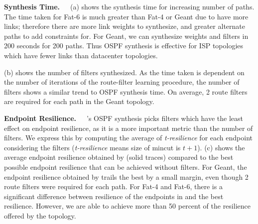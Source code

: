 \noindent\textbf{Synthesis Time.}~~~(a) 
shows the synthesis time for increasing number of paths. 
The time taken for Fat-6 is much greater than Fat-4 or Geant
due to have more links; therefore there are more link weights
to synthesize, and greater alternate paths to add constraints for. 
For Geant, we can synthesize weights and filters in 200 seconds 
for 200 paths. Thus OSPF synthesis is effective for ISP topologies
which have fewer links than datacenter topologies.

(b) shows the number of filters synthesized. 
As the time taken is dependent on the number of iterations of
the route-filter learning procedure, the number of filters
shows a similar trend to OSPF synthesis time. On average, 2 route filters
are required for each path in the Geant topology. 
\begin{figure}
	\centering
\end{figure}
\noindent\textbf{Endpoint Resilience.}~~~\name's OSPF synthesis picks
filters which have the least effect on endpoint resilience, as it  
is a more important metric than the number of filters. We express this
by computing the average of \emph{t-resilience} for each endpoint considering
the filters (\emph{t-resilience} means size of mincut is $t+1$).
(c) shows the average
endpoint resilience obtained by \name (solid traces) 
compared to the best possible endpoint resilience that  can be achieved
without filters. For Geant, the endpoint 
resilience obtained by \name trails the best by a small margin,
even though 2 route filters were required for each path. For
Fat-4 and Fat-6, there is a significant difference between resilience
of the endpoints in \name and the best resilience. 
However, we are able to achieve more than
50 percent of the resilience offered by the topology. 

